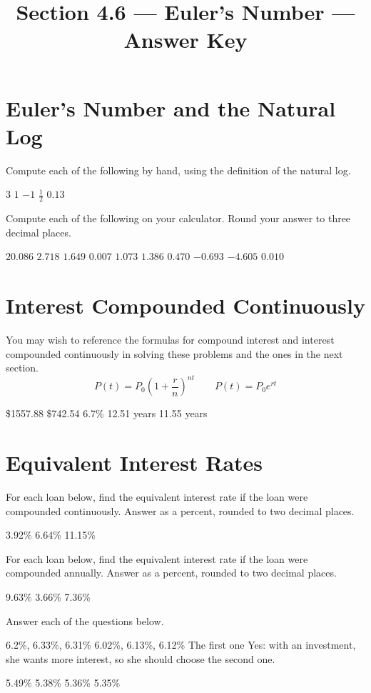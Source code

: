 

\title{Section 4.6 --- Euler's Number --- Answer Key}


\maketitle

\section*{Euler's Number and the Natural Log}
Compute each of the following by hand, using the definition of the natural log.
\begin{smenum}
\mitemxxxxx
{$3$}
{$1$}
{$-1$}
{$\frac{1}{2}$}
{$0.13$}
\end{smenum}
Compute each of the following on your calculator. Round your answer to three decimal places.
\begin{smenum}
\mitemxxxxx
{$20.086$}
{$2.718$}
{$1.649$}
{$0.007$}
{$1.073$}
\mitemxxxxx
{$1.386$}
{$0.470$}
{$-0.693$}
{$-4.605$}
{$0.010$}
\end{smenum}

\section*{Interest Compounded Continuously}
You may wish to reference the formulas for compound interest and interest compounded continuously in solving these problems and the ones in the next section.
$$P(t)=P_0\left(1+\frac{r}{n}\right)^{nt}
\qquad
P(t)=P_0e^{rt}$$
\begin{smenum}
\mitemxxxxx
{\$1557.88}
{\$742.54}
{6.7\%}
{12.51 years}
{11.55 years}
\end{smenum}

\section*{Equivalent Interest Rates}
For each loan below, find the equivalent interest rate if the loan were compounded continuously. Answer as a percent, rounded to two decimal places.
\begin{smenum}
\mitemxxx
{3.92\%}
{6.64\%}
{11.15\%}
\end{smenum}
For each loan below, find the equivalent interest rate if the loan were compounded annually. Answer as a percent, rounded to two decimal places.
\begin{smenum}
\mitemxxx
{9.63\%}
{3.66\%}
{7.36\%}
\end{smenum}
\noindent Answer each of the questions below.
\begin{senum}
\item
\begin{nmenum}
\mitemxxx
{6.2\%, 6.33\%, 6.31\%}
{6.02\%, 6.13\%, 6.12\%}
{The first one}
\mitemx
{Yes: with an investment, she wants more interest, so she should choose the second one.}
\end{nmenum}
\item
\begin{nmenum}
\mitemxxxx
{5.49\%}
{5.38\%}
{5.36\%}
{5.35\%}
\end{nmenum}
\end{senum}


